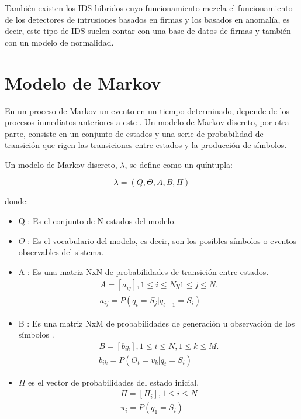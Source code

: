 También existen los IDS híbridos cuyo funcionamiento mezcla el funcionamiento de los detectores de intrusiones basados en firmas y los basados en anomalía, es decir, este tipo de  IDS suelen contar con una base de datos de firmas y también con un modelo de normalidad.

\section{Modelo de Markov}

En un proceso de Markov un evento en un tiempo determinado, depende de los procesos inmediatos anteriores a este \cite{markov}. Un modelo de Markov discreto, por otra parte, consiste en un conjunto de estados y una serie de probabilidad de transición que rigen las transiciones entre estados y la producción de símbolos.

Un modelo de Markov discreto, $\lambda$, se define como un quíntupla:

\begin{equation}
\lambda = (Q,\Theta,A,B,\Pi)
\end{equation}

donde:
 
\begin{itemize}
\item Q :  Es el conjunto de N estados del modelo.
\item $\Theta$ : Es el vocabulario del modelo, es decir, son los posibles s\'imbolos o eventos observables del sistema.
\item A : Es una matriz NxN de probabilidades de transici\'on entre estados.
\begin{equation}
\begin{aligned}
A = [a_{ij}], 1\leq i \leq N  y  1\leq j \leq N.\\
a_{ij} = P(q_{t} = S_{j} | q_{t-1} = S_{i})
\end{aligned}
\end{equation}

\item B : Es una matriz NxM de probabilidades de generaci\'on u observación de los s\'imbolos .
\begin{equation}
\begin{aligned}
B = [b_{ik}], 1\leq i \leq N, 1\leq k \leq M.\\
b_{ik} = P(O_{t} = v_{k} | q_{t} = S_{i})
\end{aligned}
\end{equation}

\item $\Pi$ es el vector de probabilidades del estado inicial.
\begin{equation}
\begin{aligned}
\Pi = [\Pi_{i}], 1\leq i \leq N \\
\pi_{i} = P(q_{1} = S_{i})
\end{aligned}
\end{equation}

\end{itemize}

